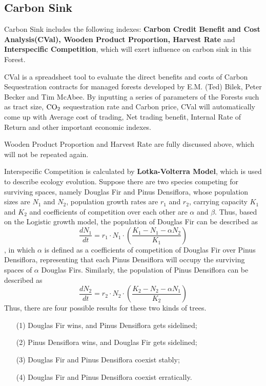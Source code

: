 \documentclass{mcmthesis}
\numberwithin{figure}{section}
\numberwithin{table}{section}
\numberwithin{equation}{section}
\begin{document}
\subsection{Carbon Sink}
Carbon Sink includes the following indexes: \textbf{Carbon Credit Benefit and 
Cost Analysis(CVal), Wooden Product Proportion, Harvest Rate} and \textbf{Interspecific 
Competition}, which will exert influence on carbon sink in this Forest.
\par
CVal is a spreadsheet tool to evaluate the direct benefits and costs of Carbon 
Sequestration contracts for managed forests developed by E.M. (Ted) Bilek,
Peter Becker and Tim McAbee. By inputting a series of parameters of the Forests
such as tract size, $ \rm{CO_2} $ sequestration rate and Carbon price, CVal will
automatically come up with Average cost of trading, Net trading benefit, 
Internal Rate of Return and other important economic indexes. 
\par
Wooden Product Proportion and Harvest Rate are fully discussed above, which will not
be repeated again.
\par
Interspecific Competition is calculated by \textbf{Lotka-Volterra Model}, which is 
used to describe ecology evolution.
Suppose there are two species competing for surviving spaces, namely
Douglas Fir and Pinus Densiflora, whose population sizes are $ N_1 $ and $ N_2 $, population growth rates
are $ r_1 $ and $ r_2 $, carrying capacity $ K_1 $ and $ K_2 $ and coefficients of competition over each other 
are $ \alpha $ and $ \beta $. 
Thus, based on the Logistic growth model, the population of Douglas Fir
can be described as 
$$
  \frac{dN_1}{dt} = r_1\cdot N_1\cdot (\frac{K_1-N_1-\alpha N_2}{K_1})
$$ 
, in which $ \alpha $ is defined as a coefficients of competition of Douglas Fir over Pinus Densiflora,
representing that each Pinus Densiflora will occupy the surviving spaces of
 $ \alpha $ Douglas Firs.
 Similarly, the population of Pinus Densiflora can be described as $$
 \frac{dN_2}{dt} = r_2\cdot N_2\cdot (\frac{K_2-N_2-\alpha N_1}{K_2})
 $$ 
Thus, there are four possible results for these two kinds of trees.
\begin{enumerate}
  \item [(1)] Douglas Fir wins, and Pinus Densiflora gets sidelined;
  \item [(2)] Pinus Densiflora wins, and Douglas Fir gets sidelined;
  \item [(3)] Douglas Fir and Pinus Densiflora coexist stably;
  \item [(4)] Douglas Fir and Pinus Densiflora coexist erratically.
\end{enumerate}
\end{document}
